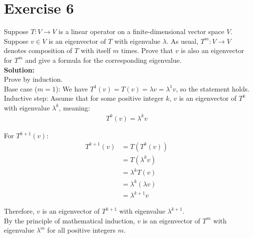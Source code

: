 \documentclass{article}
\begin{document}
\newpage

\section*{Exercise 6}
Suppose $T : V \rightarrow V$ is a linear operator on a finite-dimensional vector space $V$. Suppose $v \in V$ is an eigenvector of $T$ with eigenvalue $\lambda$. As usual, $T^m : V \rightarrow V$ denotes composition of $T$ with itself $m$ times. Prove that $v$ is also an eigenvector for $T^m$ and give a formula for the corresponding eigenvalue. \\

\textbf{Solution:} \\

Prove by induction. \\

Base case ($m = 1$): We have $T^1(v) = T(v) = \lambda v = \lambda^1 v$, so the statement holds. \\

Inductive step: Assume that for some positive integer $k$, $v$ is an eigenvector of $T^k$ with eigenvalue $\lambda^k$, meaning:
\begin{align*}
T^k(v) = \lambda^k v
\end{align*}

For $T^{k+1}(v)$:
\begin{align*}
T^{k+1}(v) &= T(T^k(v))\\
&= T(\lambda^k v)\\
&= \lambda^k T(v)\\
&= \lambda^k (\lambda v)\\
&= \lambda^{k+1} v
\end{align*}

Therefore, $v$ is an eigenvector of $T^{k+1}$ with eigenvalue $\lambda^{k+1}$. \\

By the principle of mathematical induction, $v$ is an eigenvector of $T^m$ with eigenvalue $\lambda^m$ for all positive integers $m$.
\end{document}
